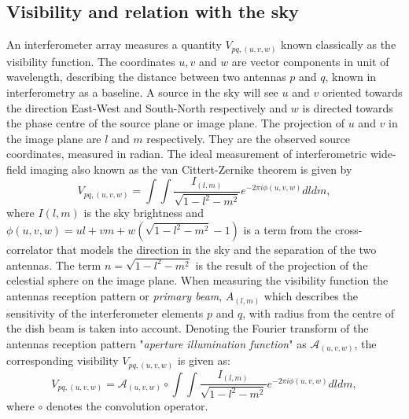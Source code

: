 \documentclass[useAMS,usenatbib]{mn2e}
\begin{document}
\subsection{Visibility and relation with the sky }
\label{sec:visSky}
An interferometer array measures a quantity $V_{pq,(u,v,w)}$ known classically as the visibility function.
The coordinates $u,v$ and $w$ are vector components in unit of wavelength, describing the distance between two antennas $p$ and $q$, known 
in interferometry as a baseline. A source in the sky will see $u$ and $v$ oriented towards the direction East-West and 
South-North respectively and $w$ is directed towards the phase centre of the source plane or image plane. The projection of $u$ and $v$ in 
the image plane are $l$ and $m$ respectively. They are the observed source coordinates, measured in radian. The ideal measurement of 
interferometric wide-field imaging also known as the van Cittert-Zernike theorem \citep{thompson1999fundamentals} is given by
\begin{equation}
 V_{pq,(u,v,w)}=\int \int \frac{I_{(l,m)}}{\sqrt{1-l^2 - m^2}}e^{-2\pi i \phi (u,v,w)}dldm, \label{eq1:visSky}
\end{equation} 
where $I(l,m)$ is the sky brightness and $\phi(u,v,w)=ul+vm+w(\sqrt{1-l^2 - m^2}-1)$ is a term from the cross-correlator that models the 
direction in the sky and the separation of the two antennas. The term $n=\sqrt{1-l^2 - m^2}$ is the result of the projection of the 
celestial 
sphere on the image plane. When measuring the visibility function the antennas reception pattern or \textit{primary beam}, $A_{(l,m)}$ 
which describes the sensitivity of the interferometer elements $p$ and $q$, with radius from the centre of the dish beam is taken into 
account. Denoting the Fourier transform of the antennas reception pattern "\textit{aperture illumination function}" as 
$\mathcal{A}_{(u,v,w)}$, the corresponding visibility $V_{pq,(u,v,w)}$ is given as:
\begin{equation}
 V_{pq,(u,v,w)}= \mathcal{A}_{(u,v,w)}\circ \int \int \frac{I_{(l,m)}}{\sqrt{1-l^2 - m^2}}e^{-2\pi i \phi (u,v,w)}dldm, \label{eq2:visSky}
\end{equation}
where $\circ$ denotes the convolution operator.
\end{document}
